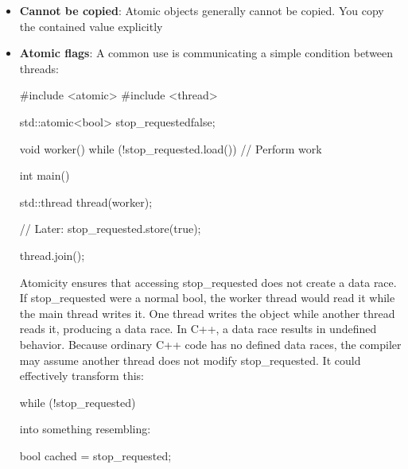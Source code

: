 \documentclass{report}
\begin{document}
\begin{itemize}
\begin{cppcode}
                value.fetch_add(5);       // Add 5; returns the old value
                value.fetch_sub(2);       // Subtract 2; returns the old value

                value++;                  // Atomic increment
                value--;                  // Atomic decrement
            \end{cppcode}
        \item \textbf{Cannot be copied}: Atomic objects generally cannot be copied. You copy the contained value explicitly
        \item \textbf{Atomic flags}: A common use is communicating a simple condition between threads:
            \bigbreak \noindent 
            \begin{ccode}
                #include <atomic>
                #include <thread>

                std::atomic<bool> stop_requested{false};

                void worker()
                {
                    while (!stop_requested.load()) {
                        // Perform work
                    }
                }

                int main()
                {
                    std::thread thread(worker);

                    // Later:
                    stop_requested.store(true);

                    thread.join();
                }
            \end{ccode}
            \bigbreak \noindent 
            Atomicity ensures that accessing stop\_requested does not create a data race. If stop\_requested were a normal bool, the worker thread would read it while the main thread writes it. One thread writes the object while another thread reads it, producing a data race. In C++, a data race results in undefined behavior.
            \bigbreak \noindent 
            Because ordinary C++ code has no defined data races, the compiler may assume another thread does not modify stop\_requested. It could effectively transform this:
            \bigbreak \noindent 
            \begin{cppcode}
                while (!stop_requested) {
                }
            \end{cppcode}
            \bigbreak \noindent 
            into something resembling:
            \bigbreak \noindent 
            \begin{cppcode}
                bool cached = stop_requested;


\end{cppcode}
\end{itemize}
\end{document}

